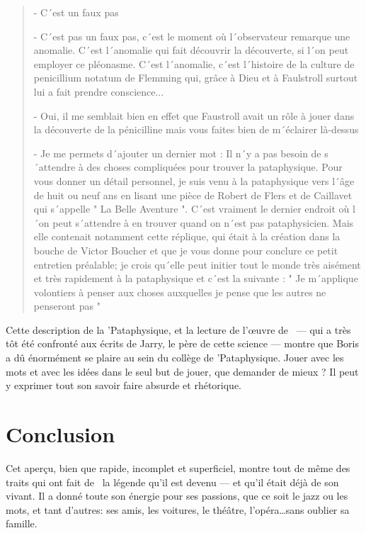 {\begin{quotation}
- C´est un faux pas

- C´est pas un faux pas, c´est le moment où l´observateur remarque une anomalie. C´est
l´anomalie qui fait découvrir la découverte, si l´on peut employer ce pléonasme. C´est
l´anomalie, c´est l´histoire de la culture de penicillium notatum de Flemming qui, grâce
à Dieu et à Faulstroll surtout lui a fait prendre conscience...

- Oui, il me semblait bien en effet que Faustroll avait un rôle à jouer dans la découverte
de la pénicilline mais vous faites bien de m´éclairer là-dessus

- Je me permets d´ajouter un dernier mot : Il n´y a pas besoin de s´attendre à des choses
compliquées pour trouver la pataphysique. Pour vous donner un détail personnel, je suis venu
à la pataphysique vers l´âge de huit ou neuf ans en lisant une pièce de Robert de Flers et
de Caillavet qui s´appelle " La Belle Aventure ". C´est vraiment le dernier endroit où l´on
peut s´attendre à en trouver quand on n´est pas pataphysicien. Mais elle contenait notamment
cette réplique, qui était à la création dans la bouche de Victor Boucher et que je vous donne
pour conclure ce petit entretien préalable; je crois qu´elle peut initier tout le monde très
aisément et très rapidement à la pataphysique et c´est la suivante : " Je m´applique
volontiers à penser aux choses auxquelles je pense que les autres ne penseront pas "

\end{quotation}
} 

Cette description de la 'Pataphysique, et la lecture de l'\oe{}uvre de \BV\ --- qui a très tôt été
confronté aux écrits de Jarry, le père de cette science --- montre que Boris a dû énormément
se plaire au sein du collège de 'Pataphysique. Jouer avec les mots et avec les
idées dans le seul but de jouer, que demander de mieux ? Il peut y exprimer tout
son savoir faire absurde et rhétorique.


\section*{Conclusion}

Cet aperçu, bien que rapide, incomplet et superficiel, montre tout de même des traits qui ont fait de \BV\ la
légende qu'il est devenu --- et qu'il était déjà de son vivant. Il a donné toute son énergie pour ses passions,
que ce soit le jazz ou les mots, et tant d'autres: ses amis, les voitures, le théâtre, l'opéra\ldots sans
oublier sa famille.

